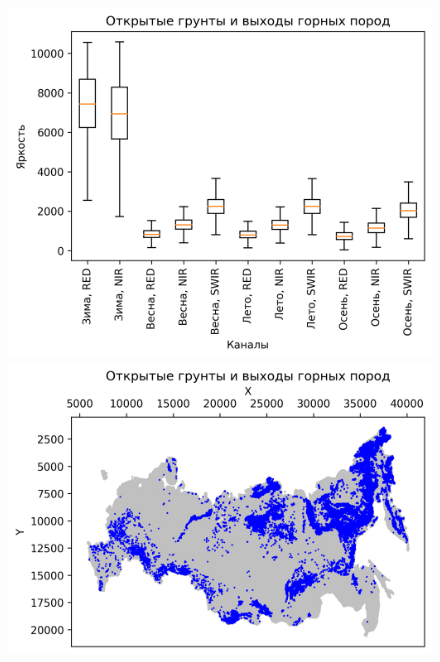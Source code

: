 \documentclass[14pt, a4paper, oneside]{extarticle}
\begin{document}
\begin{figure}[H]
    \centering
    \includegraphics[]{class-13-boxplot}
    \includegraphics[]{class-13-map}
\end{figure}
\end{document}
